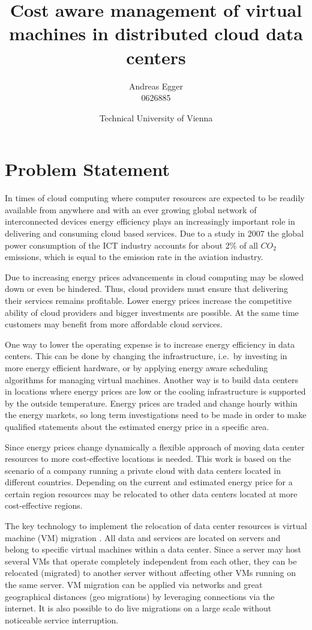 \documentclass[a4paper]{article}
\title{Cost aware management of virtual machines in distributed cloud data centers}
\author{Andreas Egger \\0626885}
\date{Technical University of Vienna}
\begin{document}
\maketitle


\section{Problem Statement}

In times of cloud computing where computer resources are expected to be readily available from anywhere \cite{buyya2009cloud} and with an ever growing global network of interconnected devices energy efficiency plays an increasingly important role in delivering and consuming cloud based services. Due to a study in 2007 \cite{gartner2007gartner} the global power consumption of the ICT industry accounts for about 2\% of all $CO_2$ emissions, which is equal to the emission rate in the aviation industry. 

Due to increasing energy prices advancements in cloud computing may be slowed down or even be hindered. Thus, cloud providers must ensure that delivering their services remains profitable. Lower energy prices increase the competitive ability of cloud providers and bigger investments are possible. At the same time customers may benefit from more affordable cloud services. 

One way to lower the operating expense is to increase energy efficiency in data centers. This can be done by changing the infrastructure, i.e.\ by investing in more energy efficient hardware, or by applying energy aware scheduling algorithms for managing virtual machines. Another way is to build data centers in locations where energy prices are low or the cooling infrastructure is supported by the outside temperature. Energy prices are traded and change hourly within the energy markets, so long term investigations need to be made in order to make qualified statements about the estimated energy price in a specific area.

Since energy prices change dynamically a flexible approach of moving data center resources to more cost-effective locations is needed. This work is based on the scenario of a company running a private cloud with data centers located in different countries. Depending on the current and estimated energy price for a certain region resources may be relocated to other data centers located at more cost-effective regions.

The key technology to implement the relocation of data center resources is virtual machine (VM) migration \cite{nelson2009virtual}. All data and services are located on servers and belong to specific virtual machines within a data center. Since a server may host several VMs that operate completely independent from each other, they can be relocated (migrated) to another server without affecting other VMs running on the same server. VM migration can be applied via networks and great geographical distances (geo migrations) by leveraging connections via the internet. It is also possible to do live migrations on a large scale without noticeable service interruption. 
\end{document}

